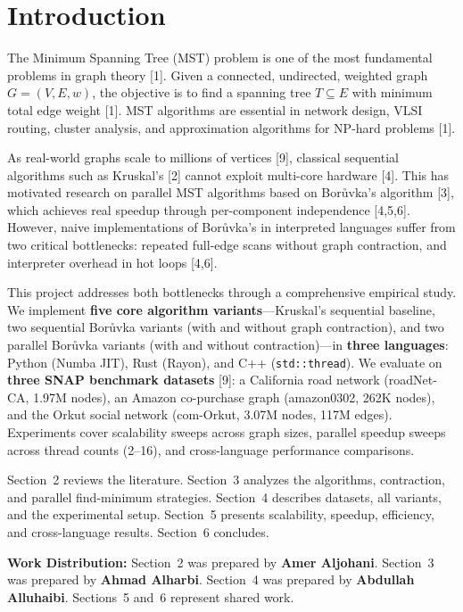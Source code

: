 \documentclass[12pt, a4paper]{article}
\begin{document}
\section{Introduction}

The Minimum Spanning Tree (MST) problem is one of the most fundamental problems in graph theory [1]. Given a connected, undirected, weighted graph $G = (V, E, w)$, the objective is to find a spanning tree $T \subseteq E$ with minimum total edge weight [1]. MST algorithms are essential in network design, VLSI routing, cluster analysis, and approximation algorithms for NP-hard problems [1].

As real-world graphs scale to millions of vertices [9], classical sequential algorithms such as Kruskal's [2] cannot exploit multi-core hardware [4]. This has motivated research on parallel MST algorithms based on Bor\r{u}vka's algorithm [3], which achieves real speedup through per-component independence [4,5,6]. However, naive implementations of Bor\r{u}vka's in interpreted languages suffer from two critical bottlenecks: repeated full-edge scans without graph contraction, and interpreter overhead in hot loops [4,6].

This project addresses both bottlenecks through a comprehensive empirical study. We implement \textbf{five core algorithm variants}---Kruskal's sequential baseline, two sequential Bor\r{u}vka variants (with and without graph contraction), and two parallel Bor\r{u}vka variants (with and without contraction)---in \textbf{three languages}: Python (Numba JIT), Rust (Rayon), and C++ (\texttt{std::thread}). We evaluate on \textbf{three SNAP benchmark datasets} [9]: a California road network (roadNet-CA, 1.97M nodes), an Amazon co-purchase graph (amazon0302, 262K nodes), and the Orkut social network (com-Orkut, 3.07M nodes, 117M edges). Experiments cover scalability sweeps across graph sizes, parallel speedup sweeps across thread counts (2--16), and cross-language performance comparisons.

Section~2 reviews the literature. Section~3 analyzes the algorithms, contraction, and parallel find-minimum strategies. Section~4 describes datasets, all variants, and the experimental setup. Section~5 presents scalability, speedup, efficiency, and cross-language results. Section~6 concludes.

\textbf{Work Distribution:} Section~2 was prepared by \textbf{Amer Aljohani}. Section~3 was prepared by \textbf{Ahmad Alharbi}. Section~4 was prepared by \textbf{Abdullah Alluhaibi}. Sections~5 and~6 represent shared work.
\end{document}
